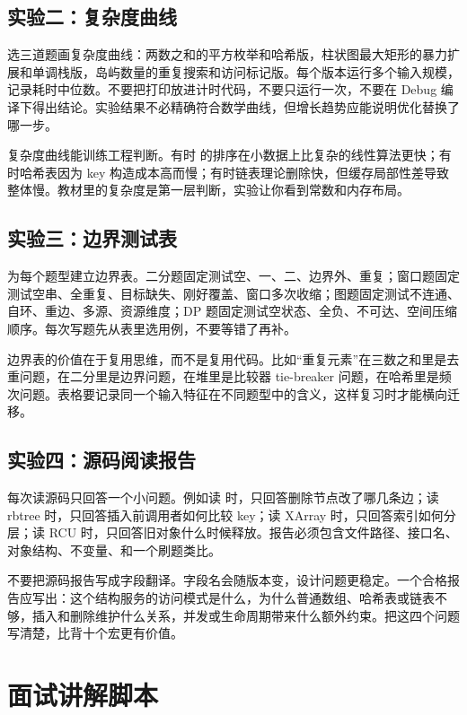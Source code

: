 \subsection{实验二：复杂度曲线}

选三道题画复杂度曲线：两数之和的平方枚举和哈希版，柱状图最大矩形的暴力扩展和单调栈版，岛屿数量的重复搜索和访问标记版。每个版本运行多个输入规模，记录耗时中位数。不要把打印放进计时代码，不要只运行一次，不要在 Debug 编译下得出结论。实验结果不必精确符合数学曲线，但增长趋势应能说明优化替换了哪一步。

复杂度曲线能训练工程判断。有时  的排序在小数据上比复杂的线性算法更快；有时哈希表因为 key 构造成本高而慢；有时链表理论删除快，但缓存局部性差导致整体慢。教材里的复杂度是第一层判断，实验让你看到常数和内存布局。

\subsection{实验三：边界测试表}

为每个题型建立边界表。二分题固定测试空、一、二、边界外、重复；窗口题固定测试空串、全重复、目标缺失、刚好覆盖、窗口多次收缩；图题固定测试不连通、自环、重边、多源、资源维度；DP 题固定测试空状态、全负、不可达、空间压缩顺序。每次写题先从表里选用例，不要等错了再补。

边界表的价值在于复用思维，而不是复用代码。比如“重复元素”在三数之和里是去重问题，在二分里是边界问题，在堆里是比较器 tie-breaker 问题，在哈希里是频次问题。表格要记录同一个输入特征在不同题型中的含义，这样复习时才能横向迁移。

\subsection{实验四：源码阅读报告}

每次读源码只回答一个小问题。例如读  时，只回答删除节点改了哪几条边；读 rbtree 时，只回答插入前调用者如何比较 key；读 XArray 时，只回答索引如何分层；读 RCU 时，只回答旧对象什么时候释放。报告必须包含文件路径、接口名、对象结构、不变量、和一个刷题类比。

不要把源码报告写成字段翻译。字段名会随版本变，设计问题更稳定。一个合格报告应写出：这个结构服务的访问模式是什么，为什么普通数组、哈希表或链表不够，插入和删除维护什么关系，并发或生命周期带来什么额外约束。把这四个问题写清楚，比背十个宏更有价值。

\section{面试讲解脚本}

